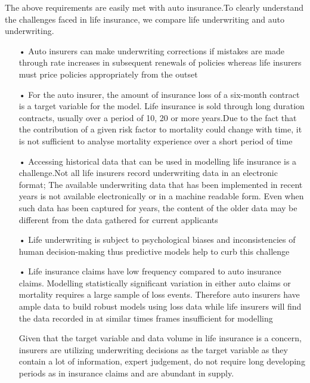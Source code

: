The above requirements are easily met with auto insurance.To clearly understand the challenges faced in life insurance, we compare life underwriting and auto underwriting.

\begin{enumerate}

\item[•] Auto insurers can make underwriting corrections if mistakes are made through rate increases in subsequent renewals of policies whereas life insurers must price policies appropriately from the outset

\item[•] For the auto insurer, the amount of insurance loss of a six-month contract is a target variable for the model. Life insurance is sold through long duration contracts, usually over a period of 10, 20 or more years.Due to the fact that the contribution of a given risk factor to mortality could change with time, it is not sufficient to analyse mortality experience over a short period of time

\item[•] Accessing historical data that can be used in modelling life insurance is a challenge.Not all life insurers record underwriting data in an electronic format; The available underwriting data that has been implemented in recent years is not available electronically or in a machine readable form. Even when such data has been captured for years, the content of the older data may be different from the data gathered for current applicants

\item[•] Life underwriting is subject to psychological biases and inconsistencies of human decision-making thus predictive models help to curb this challenge

\item[•] Life insurance claims have low frequency compared to auto insurance claims. Modelling statistically significant variation in either auto claims or mortality requires a large sample of loss events. Therefore auto insurers have ample data to build robust models using loss data while life insurers will find the data recorded in at similar times frames insufficient for modelling

Given that the target variable and data volume in life insurance is a concern, insurers are utilizing underwriting decisions as the target variable as they contain a lot of information, expert judgement, do not require long developing periods as in insurance claims and are abundant in supply.
\end{enumerate}

